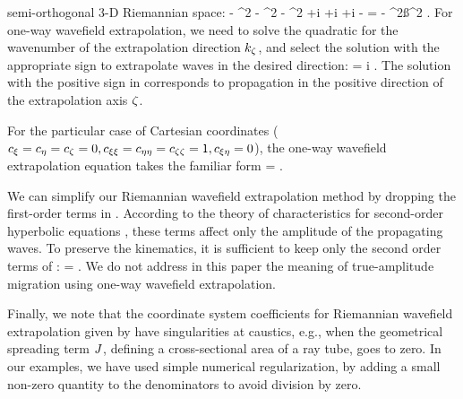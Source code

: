 semi-orthogonal {3-D} Riemannian space:
\beq \label{eqn:disp.3d}
- \czz \kz^2
- \cxx \kx^2
- \cyy \ky^2
+i\cz  \kz
+i\cx  \kx
+i\cy  \ky
- \cxy \kx\ky = - \ww^2\ss^2 \;.
\eeq
For one-way wavefield extrapolation, we need to solve
the quadratic  
for the wavenumber of the extrapolation direction $k_\zeta$,
and select the solution with the appropriate sign to
extrapolate waves in the desired direction:
\beq \label{eqn:oneway.3d}
\kz = i \frac{\cz}{2\czz} \pm
{}\;.
\eeq
The solution with the positive sign in  corresponds to 
propagation in the positive direction of the extrapolation axis $\zeta$.
\par
For the particular case of Cartesian coordinates
($c_{\xi }=c_{\eta }=c_{\zeta }=0, c_{\xi\xi}=c_{\eta\eta}=c_{\zeta\zeta}=1, c_{\xi\eta}=0$),
the one-way wavefield extrapolation equation takes the
familiar form
\beq
\kz = \pm{}\;.
\eeq
\par
We can simplify our Riemannian wavefield extrapolation method 
by dropping the first-order terms in . 
According to the theory of 
characteristics for
second-order hyperbolic equations \cite[]{courant}, 
these terms affect only the amplitude of the propagating waves. 
To preserve the kinematics, it is sufficient to keep only the 
second order terms of :
\beq \label{eqn:oneway.3d.kinematic}
\kz = \pm
{}\;.
\eeq
We do not address in this paper the meaning of true-amplitude
migration using one-way wavefield extrapolation.
\par
Finally, we note that the coordinate system coefficients for 
Riemannian wavefield extrapolation given by  
have singularities at caustics, 
e.g., when the geometrical spreading term $J$,
defining a cross-sectional area of a ray tube, goes to zero.
In our examples, we have used simple numerical
regularization, by adding a small non-zero quantity to the 
denominators to avoid division by zero. 
